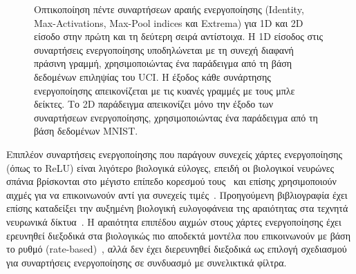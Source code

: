 \begin{figure}
	\caption[Οπτικοποίηση χαρτών ενεργοποίησης πέντε συναρτήσεων αραιής ενεργοποίησης (Identity, ReLU, top-k absolutes, Extrema-Pool indices και Extrema) για 1D και 2D είσοδο.]{Οπτικοποίηση πέντε συναρτήσεων αραιής ενεργοποίησης (Identity, Max-Activations, Max-Pool indices και Extrema) για 1D και 2D είσοδο στην πρώτη και τη δεύτερη σειρά αντίστοιχα.
	Η 1D είσοδος στις συναρτήσεις ενεργοποίησης υποδηλώνεται με τη συνεχή διαφανή πράσινη γραμμή, χρησιμοποιώντας ένα παράδειγμα από τη βάση δεδομένων επιληψίας του UCI\@.
	Η έξοδος κάθε συνάρτησης ενεργοποίησης απεικονίζεται με τις κυανές γραμμές με τους μπλε δείκτες.
	Το 2D παράδειγμα απεικονίζει μόνο την έξοδο των συναρτήσεων ενεργοποίησης, χρησιμοποιώντας ένα παράδειγμα από τη βάση δεδομένων MNIST\@.
	}
	\label{fig:activationfunctions}
\end{figure}

Επιπλέον συναρτήσεις ενεργοποίησης που παράγουν συνεχείς χάρτες ενεργοποίησης (όπως το ReLU) είναι λιγότερο βιολογικά εύλογες, επειδή οι βιολογικοί νευρώνες σπάνια βρίσκονται στο μέγιστο επίπεδο κορεσμού τους~\cite{bush1996inhibition} και επίσης χρησιμοποιούν αιχμές για να επικοινωνούν αντί για συνεχείς τιμές~\cite{bengio2015towards}.
Προηγούμενη βιβλιογραφία έχει επίσης καταδείξει την αυξημένη βιολογική ευλογοφάνεια της αραιότητας στα τεχνητά νευρωνικά δίκτυα~\cite{rehn2007network}.
Η αραιότητα επιπέδου αιχμών στους χάρτες ενεργοποίησης έχει ερευνηθεί διεξοδικά στα βιολογικώς πιο αποδεκτά μοντέλα που επικοινωνούν με βάση το ρυθμό (rate-based)~\cite{heiberg2018firing}, αλλά δεν έχει διερευνηθεί διεξοδικά ως επιλογή σχεδιασμού για συναρτήσεις ενεργοποίησης σε συνδυασμό με συνελικτικά φίλτρα.

